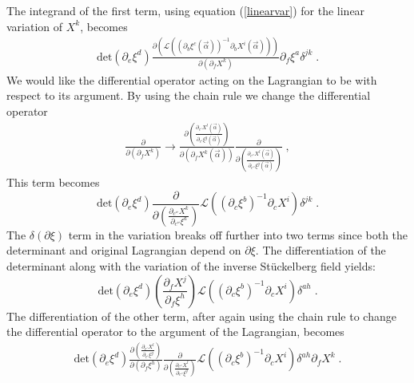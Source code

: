 \documentclass[%
 reprint,
 amsmath,amssymb,
 aps,
]{revtex4-1}
\begin{document}
The integrand of the first term, using equation (\ref{linearvar}) for
the linear variation of $X^k$, becomes
\begin{eqnarray}
    \mathrm{det}(\partial_e \xi^d)
    \frac{\partial \left(
    \mathcal{L}\left( \left( \partial_b \xi^c (\vec{\alpha}) \right)^{-1}
    \partial_b X^i(\vec{\alpha}) \right) \right)}{\partial \left(
    \partial_f X^k \right)} \partial_f \xi^a \delta^{j k} \; . \nonumber
\end{eqnarray}
We would like the differential operator acting on the Lagrangian to be with respect to its argument.
By using the chain rule we change the differential operator
\begin{eqnarray}
    \frac{\partial}{\partial (\partial_f X^k) } \rightarrow
    \frac{\partial \left( \frac{\partial_{c'} X^l (\vec{\alpha})}{\partial_{c'}
    \xi^g (\vec{\alpha}) } \right)}{\partial ( \partial_f
    X^k (\vec{\alpha}) ) } \frac{\partial}{\partial \left( \frac{\partial_{c''} X^l
    (\vec{\alpha}) }{\partial_{c''} \xi^g (\vec{\alpha}) } \right)} \; , \nonumber
\end{eqnarray}
This term becomes
\begin{equation}
\label{term1}
    \mathrm{det} ( \partial_e \xi^d )
    \frac{\partial}{\partial \left( \frac{\partial_{c''} X^k}{\partial_{c''} \xi^a} \right)}
    \mathcal{L}\left( (\partial_c \xi^b)^{-1} \partial_c X^i \right) \delta^{j k} \; .
\end{equation}
The $\delta (\partial\xi)$ term in the variation breaks off further into two terms since both the determinant and original
Lagrangian depend on $\partial \xi$. The differentiation of the determinant along with the variation of the inverse St\"uckelberg
field yields:
\begin{equation}
\label{term2}
    \mathrm{det} ( \partial_e \xi^d ) \left( \frac{\partial_f X^j}{\partial_f \xi^h}
    \right) \mathcal{L} \left( (\partial_c \xi^b )^{-1} \partial_c X^i \right) \delta^{a h} \; .
\end{equation}
The differentiation of the other term, after again using the chain rule to change the differential
operator to the argument of the Lagrangian, becomes
\begin{eqnarray}
    \mathrm{det} ( \partial_e \xi^d )
    \frac{\partial \left( \frac{\partial_{c'} X^l}{\partial_{c'} \xi^g} \right)}{\partial
    \left( \partial_f \xi^h \right)}
    \frac{\partial}{\partial \left( \frac{\partial_{c''} X^l}{\partial_{c''} \xi^g} \right)}
    \mathcal{L} \left( (\partial_c \xi^b)^{-1} \partial_c X^i \right) \delta^{a h}
    \partial_f X^k \; . \nonumber
\end{eqnarray}
\end{document}
